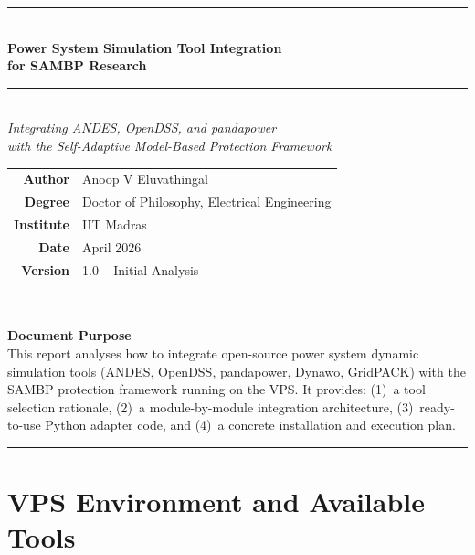 \documentclass[11pt,a4paper]{article}
\begin{document}
\begin{titlepage}
\centering
\vspace*{1cm}
{\color{sambpblue}\rule{\linewidth}{2pt}}\\[0.4cm]
{\huge\bfseries\color{sambpblue} Power System Simulation Tool Integration\\[0.3cm]
for SAMBP Research}\\[0.3cm]
{\color{sambpblue}\rule{\linewidth}{1pt}}\\[1cm]

{\large\textit{Integrating ANDES, OpenDSS, and pandapower\\
with the Self-Adaptive Model-Based Protection Framework}}\\[2cm]

\begin{tabular}{rl}
\textbf{Author}    & Anoop V Eluvathingal \\[4pt]
\textbf{Degree}    & Doctor of Philosophy, Electrical Engineering \\[4pt]
\textbf{Institute} & IIT Madras \\[4pt]
\textbf{Date}      & April 2026 \\[4pt]
\textbf{Version}   & 1.0 -- Initial Analysis
\end{tabular}\\[2cm]

\begin{infobox}
\textbf{Document Purpose}\\[4pt]
This report analyses how to integrate open-source power system dynamic
simulation tools (ANDES, OpenDSS, pandapower, Dynawo, GridPACK) with the
SAMBP protection framework running on the VPS. It provides:
(1)~a tool selection rationale, (2)~a module-by-module integration
architecture, (3)~ready-to-use Python adapter code, and (4)~a concrete
installation and execution plan.
\end{infobox}

\vfill
{\color{sambpblue}\rule{\linewidth}{1pt}}
\end{titlepage}

\tableofcontents
\newpage

\section{VPS Environment and Available Tools}
\end{document}
